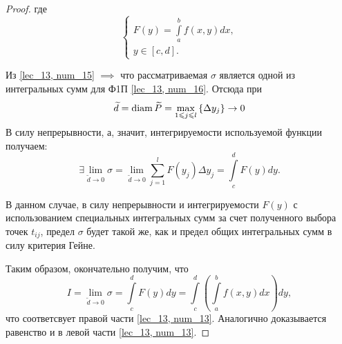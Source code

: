\documentclass[../../main.tex]{subfiles}
\begin{document}
\begin{proof}
 	где
 	\begin{equation}
 	\label{lec_13, num_16}
 	\begin{cases}
 	F \left( y \right) = \displaystyle
 	\int\limits_a^b f \left( x, y \right) dx, \\
 	y \in \left[ c, d \right]. 
 	\end{cases}
 	\end{equation}
 	
 	Из \eqref{lec_13, num_15} $ \implies $ что рассматриваемая $\sigma$
 	является одной из интегральных сумм для Ф1П  \eqref{lec_13, num_16}.
 	Отсюда при 
 	\[ \widetilde{d} = \operatorname{diam} \widetilde{P} = 
 		\underset{1 \leqslant j \leqslant l} {\max} \left\lbrace \Delta y_j \right\rbrace 
 	\to 0 \]
 	В силу непрерывности, а, значит, интегрируемости
 	используемой функции получаем: 
 	\[ \exists \lim\limits_{ \widetilde{d} \to 0 } \sigma = 
 	\lim\limits_{ \widetilde{d} \to 0 } 
 	\sum\limits_{j = 1}^l F \left( y_j \right) \Delta y_j =
 	\int\limits_c^d F \left( y \right)dy. \]
 	
 	В данном случае, в силу непрерывности и 
 	интегрируемости $F(y)$ с использованием
 	специальных интегральных сумм за счет полученного 
 	выбора точек $t_{ij}$, предел 
 	$ \sigma $ будет такой же, как и предел общих интегральных сумм 
 	в силу критерия Гейне.
 	
 	Таким образом, окончательно получим, что
 	\[ I = \lim\limits_{ \widetilde{d} \to 0 } \sigma = 
 	\int\limits_c^d F \left( y \right) dy =
 	\int\limits_c^d \left( \int\limits_a^b 
 	f \left( x, y\right) dx \right) dy, \]
 	что соответсвует правой части \eqref {lec_13, num_13}.
 	Аналогично доказывается равенство и в левой части \eqref {lec_13, num_13}.
\end{proof}
\end{document}
